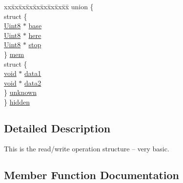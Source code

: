 \begin{DoxyCompactItemize}
\item 
\begin{tabbing}
xx\=xx\=xx\=xx\=xx\=xx\=xx\=xx\=xx\=\kill
union \{\\
\>struct \{\\
\>\>\hyperlink{_s_d_l__stdinc_8h_a2944638813a090aa23e62f4da842c3e2}{Uint8} $\ast$ \hyperlink{struct_s_d_l___r_wops_af9b489d7342296ce197b911cfa93b2ab}{base}\\
\>\>\hyperlink{_s_d_l__stdinc_8h_a2944638813a090aa23e62f4da842c3e2}{Uint8} $\ast$ \hyperlink{struct_s_d_l___r_wops_a6fc84601c17e347c6ef24c63a79deb57}{here}\\
\>\>\hyperlink{_s_d_l__stdinc_8h_a2944638813a090aa23e62f4da842c3e2}{Uint8} $\ast$ \hyperlink{struct_s_d_l___r_wops_a4108a41afa8b62e75b0f160de4b56103}{stop}\\
\>\} \hyperlink{struct_s_d_l___r_wops_a540713999ec73a45a71b3f12b674c2b0}{mem}\\
\>struct \{\\
\>\>\hyperlink{_s_d_l__opengles2__gl2ext_8h_ae5d8fa23ad07c48bb609509eae494c95}{void} $\ast$ \hyperlink{struct_s_d_l___r_wops_ab89d27b4312c0b9d664c81bc92917fc8}{data1}\\
\>\>\hyperlink{_s_d_l__opengles2__gl2ext_8h_ae5d8fa23ad07c48bb609509eae494c95}{void} $\ast$ \hyperlink{struct_s_d_l___r_wops_aca073130e2e262eb11e86e1be993e215}{data2}\\
\>\} \hyperlink{struct_s_d_l___r_wops_a6b636d6299921142a119931d76a588b7}{unknown}\\
\} \hyperlink{struct_s_d_l___r_wops_a282e9150d26585bdf1590726190e62f3}{hidden}\\

\end{tabbing}\end{DoxyCompactItemize}


\subsection{Detailed Description}
This is the read/write operation structure -- very basic. 

\subsection{Member Function Documentation}
\mbox{\label{struct_s_d_l___r_wops_ab303bcbb0f6742a141ba8b2998923f47}} 

